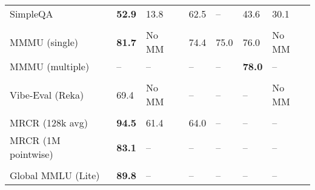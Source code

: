 \documentclass{scrartcl}
\begin{document}
\begin{table}[H]
\begin{threeparttable}
\begin{tabularx}{\textwidth}{@{} L T{2.1} T{2.1} T{2.1} T{2.1} T{2.1} T{2.1} @{}}
            SimpleQA                          & \bfseries 52.9                  & 13.8                & 62.5               & {--}                  & 43.6                   & 30.1                   \\
            \addlinespace
                                                                                                                                                     \\[1ex]
            MMMU (single)                     & \bfseries 81.7                  & {No MM}\tnote{\dag} & 74.4               & 75.0                  & 76.0                   & {No MM}\tnote{\dag}    \\
            MMMU (multiple)                   & {--}                            & {--}                & {--}               & {--}                  & \bfseries 78.0         & {--}                   \\
            \addlinespace
                                                                                                                                                  \\[1ex]
            Vibe-Eval (Reka)                  & 69.4                            & {No MM}\tnote{\dag} & {--}               & {--}                  & {--}                   & {No MM}\tnote{\dag}    \\
            \addlinespace
                                                                                                                                                         \\[1ex]
            MRCR (128k avg)                   & \bfseries 94.5                  & 61.4                & 64.0               & {--}                  & {--}                   & {--}                   \\
            MRCR (1M pointwise)               & \bfseries 83.1                  & {--}                & {--}               & {--}                  & {--}                   & {--}                   \\
            \addlinespace
                                                                                                                                             \\[1ex]
            Global MMLU (Lite)                & \bfseries 89.8                  & {--}                & {--}               & {--}                  & {--}                   & {--}                   \\

\end{tabularx}
\end{threeparttable}
\end{table}
\end{document}
